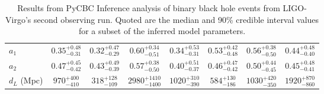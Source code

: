 \begin{table}[t]
\begin{adjustwidth}{-1.5cm}{}
\begin{tabular}{lccccccc}
\vspace*{0.1cm}
$a_1$ & $0.35^{+0.48}_{-0.31}$ & $0.32^{+0.47}_{-0.29}$ & $0.60^{+0.34}_{-0.51}$ & $0.34^{+0.53}_{-0.31}$ & $0.53^{+0.42}_{-0.48}$ & $0.56^{+0.38}_{-0.50}$ & $0.44^{+0.48}_{-0.40}$ \\
\vspace*{0.1cm}
$a_2$ & $0.47^{+0.45}_{-0.42}$ & $0.43^{+0.49}_{-0.39}$  & $0.57^{+0.38}_{-0.50}$ & $0.40^{+0.51}_{-0.37}$ & $0.46^{+0.47}_{-0.42}$ & $0.50^{+0.44}_{-0.45}$ & $0.45^{+0.48}_{-0.41}$ \\
\vspace*{0.1cm}
$d_L$ (Mpc) & $970^{+400}_{-410}$ & $318^{+128}_{-109}$ & $2980^{+1410}_{-1400}$ & $1020^{+310}_{-390}$ & $584^{+130}_{-186}$ & $1030^{+420}_{-350}$ & $1920^{+870}_{-860}$ \\
\hline
\end{tabular}
\caption{Results from PyCBC Inference analysis of binary black hole events from LIGO-Virgo's second observing run. Quoted are the median and 90\% credible interval values for a subset of the inferred model parameters.}
\label{tab:results}
\end{adjustwidth}
\end{table}



